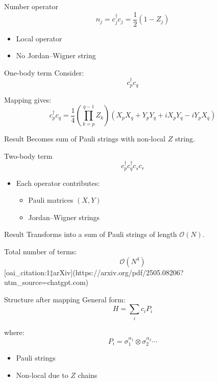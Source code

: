 \documentclass[aspectratio=169]{beamer}
\begin{document}
\begin{frame}{Number operator}
\[
n_j = c_j^\dagger c_j = \frac{1}{2}(1 - Z_j)
\]

\begin{itemize}
\item Local operator
\item No Jordan--Wigner string
\end{itemize}
\end{frame}

\begin{frame}{One-body term}
Consider:
\[
c_p^\dagger c_q
\]

Mapping gives:
\[
c_p^\dagger c_q =
\frac{1}{4}
\left(\prod_{k=p}^{q-1} Z_k\right)
(X_p X_q + Y_p Y_q + i X_p Y_q - i Y_p X_q)
\]

\begin{block}{Result}
Becomes sum of Pauli strings with non-local $Z$ string.
\end{block}
\end{frame}

\begin{frame}{Two-body term}
\[
c_p^\dagger c_q^\dagger c_s c_r
\]

\begin{itemize}
\item Each operator contributes:
\begin{itemize}
\item Pauli matrices $(X,Y)$
\item Jordan--Wigner strings
\end{itemize}
\end{itemize}

\medskip

\begin{block}{Result}
Transforms into a sum of Pauli strings of length $\mathcal{O}(N)$.
\end{block}

\medskip

Total number of terms:
\[
\mathcal{O}(N^4)
\]
 [oai_citation:1‡arXiv](https://arxiv.org/pdf/2505.08206?utm_source=chatgpt.com)
\end{frame}

\begin{frame}{Structure after mapping}
General form:
\[
H = \sum_i c_i P_i
\]

where:
\[
P_i = \sigma^{\alpha_1}_1 \otimes \sigma^{\alpha_2}_2 \cdots
\]

\begin{itemize}
\item Pauli strings
\item Non-local due to $Z$ chains
\end{itemize}
\end{frame}
\end{document}
